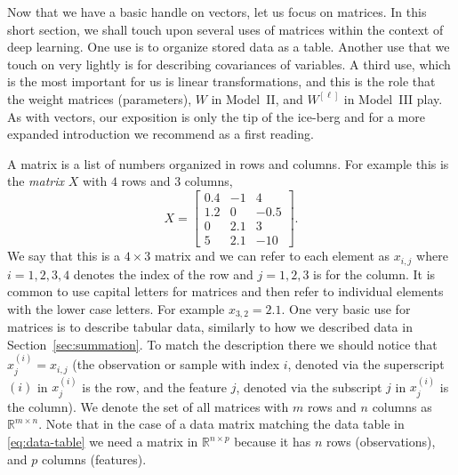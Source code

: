 Now that we have a basic handle on vectors, let us focus on matrices. In this short section, we shall touch upon several uses of matrices within the context of deep learning. One use is to organize stored data as a table. Another use that we touch on very lightly is for describing covariances of variables. A third use, which is the most important for us is linear transformations, and this is the role that the weight matrices (parameters), $W$ in Model~II, and $W^{[\ell]}$ in Model~III play. As with vectors, our exposition is only the tip of the ice-berg and for a more expanded introduction we recommend \cite{boyd2018introduction} as a first reading.

A matrix is a list of numbers organized in rows and columns. For example this is the {\em matrix} $X$ with $4$ rows and $3$ columns,
%
\begin{equation}
\label{eq:matrix-example-1}
X
=
\begin{bmatrix}
    0.4 & -1 & 4\\
    1.2 & 0 & -0.5 \\
    0 &  2.1 & 3 \\
    5 & 2.1 & -10
 \end{bmatrix}.
\end{equation}
%
We say that this is a $4 \times 3$ matrix and we can refer to each element as $x_{i,j}$ where $i=1,2,3,4$ denotes the index of the row and $j=1,2,3$ is for the column. It is common to use capital letters for matrices and then refer to individual elements with the lower case letters. For example $x_{3,2} = 2.1$. One very basic use for matrices is to describe tabular data, similarly to how we described data in  Section~\ref{sec:summation}. To match the description there we should notice that $x^{(i)}_j = x_{i,j}$ (the observation or sample with index $i$, denoted via the superscript $(i)$ in $x^{(i)}_j$ is the row, and the feature $j$, denoted via the subscript $j$ in $x^{(i)}_j$ is the column). We denote the set of all matrices with $m$ rows and $n$ columns as ${\mathbb R}^{m \times n}$. Note that in the case of a data matrix matching the data table in \eqref{eq:data-table} we need a matrix in ${\mathbb R}^{n \times p}$ because it has $n$ rows (observations), and $p$ columns (features).

